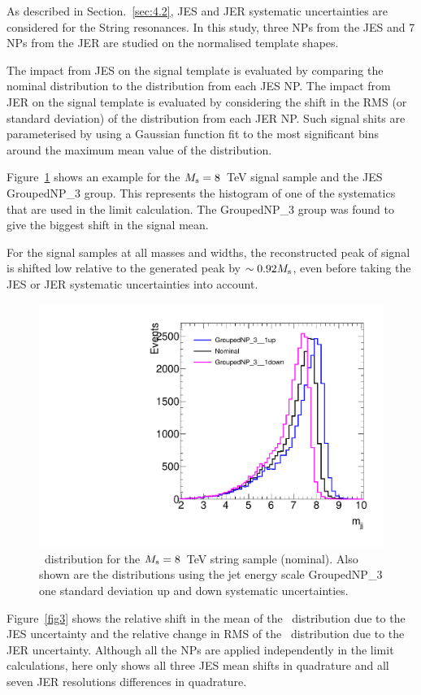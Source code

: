 As described in Section.~\ref{sec:4.2}, JES and JER systematic uncertainties are considered for the String resonances. In this study, three NPs from the JES and 7 NPs from the JER are studied on the normalised template shapes. 

The impact from JES on the signal template is evaluated by comparing the nominal distribution to the distribution from each JES NP. The impact from JER on the signal template is evaluated by considering the shift in the RMS (or standard deviation) of the distribution from each JER NP. Such signal shits are parameterised by using a Gaussian function fit to the most significant bins around
the maximum mean value of the distribution. 


Figure~\ref{fig2} shows an example for the $M_\mathrm{s} = 8$~TeV signal sample
and the JES GroupedNP\_3 group.
This represents the histogram of one of the systematics that are used in
the limit calculation.
The GroupedNP\_3 group was found to give the biggest shift in the signal
mean.

For the signal samples at all masses and widths, the reconstructed peak of signal is shifted low relative to the generated peak by $\sim
0.92M_\mathrm{s}$, even before taking the JES or JER systematic
uncertainties into account.

\begin{figure}[htb]
\begin{center}
\includegraphics[width=0.65\linewidth]{fig/strings/JES_shift}
\end{center}
\caption{\mjj\ distribution for the $M_\mathrm{s} = 8$~TeV string sample (nominal).
Also shown are the distributions using the jet energy scale
GroupedNP\_3 one standard deviation up and down systematic uncertainties.}
\label{fig2}
\end{figure}

Figure~\ref{fig3} shows the relative shift in the mean of the \mjj\
distribution due to the JES uncertainty and the relative change in RMS
of the \mjj\ distribution due to the JER uncertainty. 
Although all the NPs are applied independently in the
limit calculations, here only shows all three JES mean shifts in quadrature
and all seven JER resolutions differences in quadrature. 

